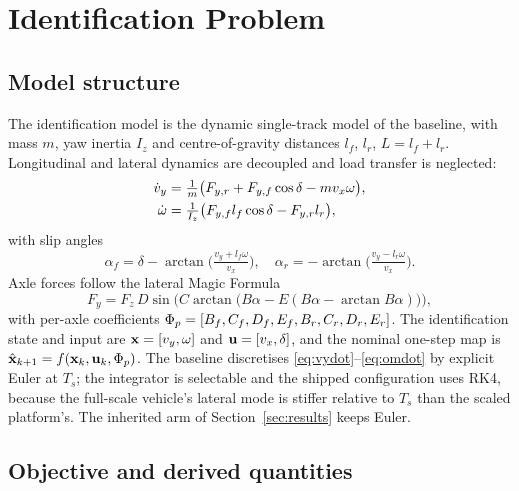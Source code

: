 \section{Identification Problem}
\label{sec:problem}

\subsection{Model structure}
\label{subsec:model}

The identification model is the dynamic single-track model of the baseline,
with mass $m$, yaw inertia $I_{z}$ and centre-of-gravity distances $l_{f}$,
$l_{r}$, $L=l_{f}+l_{r}$. Longitudinal and lateral dynamics are decoupled and
load transfer is neglected:
\begin{align}
\dot v_{y} &= \tfrac{1}{m}\big(F_{y,r}+F_{y,f}\cos\delta - m v_{x}\omega\big),\label{eq:vydot}\\
\dot\omega &= \tfrac{1}{I_{z}}\big(F_{y,f} l_{f}\cos\delta - F_{y,r} l_{r}\big),\label{eq:omdot}
\end{align}
with slip angles
\begin{equation}
\alpha_{f}=\delta-\arctan\!\Big(\tfrac{v_{y}+l_{f}\omega}{v_{x}}\Big),\quad
\alpha_{r}=-\arctan\!\Big(\tfrac{v_{y}-l_{r}\omega}{v_{x}}\Big).
\label{eq:slip}
\end{equation}
Axle forces follow the lateral Magic Formula
\begin{equation}
F_{y}=F_{z}\,D\sin\!\big(C\arctan\!\big(B\alpha-E(B\alpha-\arctan B\alpha)\big)\big),
\label{eq:mf}
\end{equation}
with per-axle coefficients
$\Phi_{p}=[B_{f},C_{f},D_{f},E_{f},B_{r},C_{r},D_{r},E_{r}]$. The identification
state and input are $\mathbf{x}=[v_{y},\omega]$ and $\mathbf{u}=[v_{x},\delta]$, and the
nominal one-step map is $\hat{\mathbf{x}}_{k+1}=f(\mathbf{x}_{k},\mathbf{u}_{k},\Phi_{p})$. The
baseline discretises \eqref{eq:vydot}--\eqref{eq:omdot} by explicit Euler at
$T_{s}$; the integrator is selectable and the shipped configuration uses RK4,
because the full-scale vehicle's lateral mode is stiffer relative to $T_{s}$
than the scaled platform's. The inherited arm of Section~\ref{sec:results}
keeps Euler.

\subsection{Objective and derived quantities}

